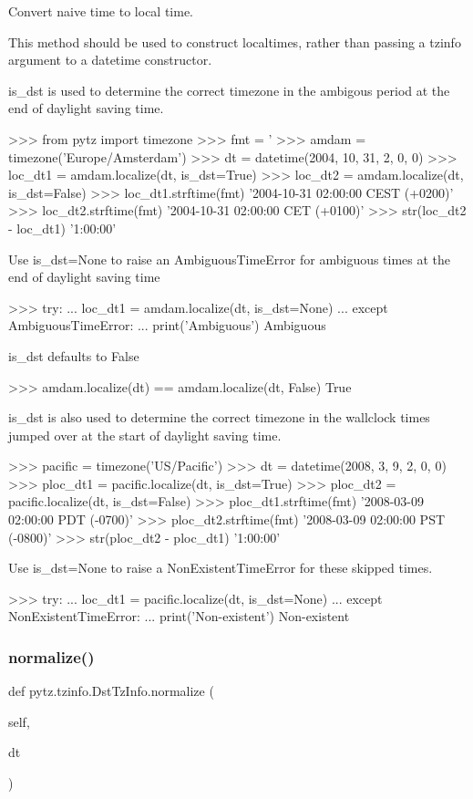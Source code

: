 \begin{DoxyVerb}Convert naive time to local time.

This method should be used to construct localtimes, rather
than passing a tzinfo argument to a datetime constructor.

is_dst is used to determine the correct timezone in the ambigous
period at the end of daylight saving time.

>>> from pytz import timezone
>>> fmt = '%
>>> amdam = timezone('Europe/Amsterdam')
>>> dt  = datetime(2004, 10, 31, 2, 0, 0)
>>> loc_dt1 = amdam.localize(dt, is_dst=True)
>>> loc_dt2 = amdam.localize(dt, is_dst=False)
>>> loc_dt1.strftime(fmt)
'2004-10-31 02:00:00 CEST (+0200)'
>>> loc_dt2.strftime(fmt)
'2004-10-31 02:00:00 CET (+0100)'
>>> str(loc_dt2 - loc_dt1)
'1:00:00'

Use is_dst=None to raise an AmbiguousTimeError for ambiguous
times at the end of daylight saving time

>>> try:
...     loc_dt1 = amdam.localize(dt, is_dst=None)
... except AmbiguousTimeError:
...     print('Ambiguous')
Ambiguous

is_dst defaults to False

>>> amdam.localize(dt) == amdam.localize(dt, False)
True

is_dst is also used to determine the correct timezone in the
wallclock times jumped over at the start of daylight saving time.

>>> pacific = timezone('US/Pacific')
>>> dt = datetime(2008, 3, 9, 2, 0, 0)
>>> ploc_dt1 = pacific.localize(dt, is_dst=True)
>>> ploc_dt2 = pacific.localize(dt, is_dst=False)
>>> ploc_dt1.strftime(fmt)
'2008-03-09 02:00:00 PDT (-0700)'
>>> ploc_dt2.strftime(fmt)
'2008-03-09 02:00:00 PST (-0800)'
>>> str(ploc_dt2 - ploc_dt1)
'1:00:00'

Use is_dst=None to raise a NonExistentTimeError for these skipped
times.

>>> try:
...     loc_dt1 = pacific.localize(dt, is_dst=None)
... except NonExistentTimeError:
...     print('Non-existent')
Non-existent
\end{DoxyVerb}
 \mbox{\label{classpytz_1_1tzinfo_1_1DstTzInfo_a87d54c8354b70d420fa322c8577ad659}} 
\subsubsection{\texorpdfstring{normalize()}{normalize()}}
{\footnotesize\ttfamily def pytz.\+tzinfo.\+Dst\+Tz\+Info.\+normalize (\begin{DoxyParamCaption}\item[{}]{self,  }\item[{}]{dt }\end{DoxyParamCaption})}

